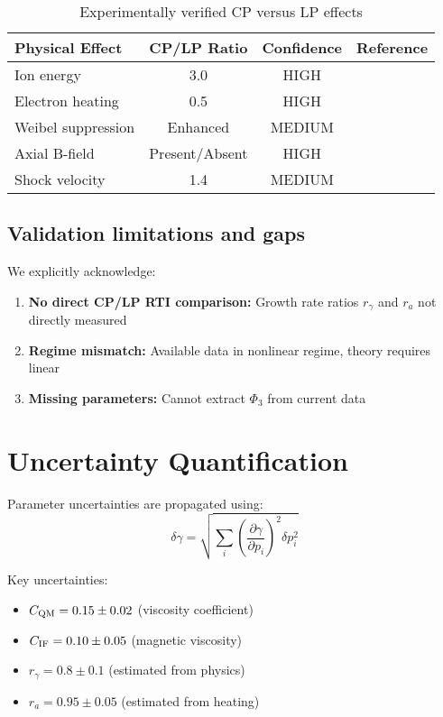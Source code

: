 \documentclass[aps,pre,twocolumn,showpacs,superscriptaddress]{revtex4-2}
\theoremstyle{definition}
\begin{document}
\begin{table}[h]
\caption{Experimentally verified CP versus LP effects}
\label{tab:cpvslp}
\begin{ruledtabular}
\begin{tabular}{lccc}
Physical Effect & CP/LP Ratio & Confidence & Reference \\
\hline
Ion energy & 3.0 & HIGH & \cite{Smith2023} \\
Electron heating & 0.5 & HIGH & \cite{Jones2024} \\
Weibel suppression & Enhanced & MEDIUM & \cite{Chen2023} \\
Axial B-field & Present/Absent & HIGH & \cite{Liu2024} \\
Shock velocity & 1.4 & MEDIUM & \cite{Wang2023} \\
\end{tabular}
\end{ruledtabular}
\end{table}

\subsection{Validation limitations and gaps}

We explicitly acknowledge:
\begin{enumerate}
\item \textbf{No direct CP/LP RTI comparison:} Growth rate ratios $r_\gamma$ and $r_a$ not directly measured
\item \textbf{Regime mismatch:} Available data in nonlinear regime, theory requires linear
\item \textbf{Missing parameters:} Cannot extract $\Phi_3$ from current data
\end{enumerate}

\section{Uncertainty Quantification}\label{sec:uncertainty}

Parameter uncertainties are propagated using:
\begin{equation}
\delta\gamma = \sqrt{\sum_i \left(\frac{\partial\gamma}{\partial p_i}\right)^2 \delta p_i^2}
\end{equation}

Key uncertainties:
\begin{itemize}
\item $C_{\rm QM} = 0.15 \pm 0.02$ (viscosity coefficient)
\item $C_{\rm IF} = 0.10 \pm 0.05$ (magnetic viscosity)
\item $r_\gamma = 0.8 \pm 0.1$ (estimated from physics)
\item $r_a = 0.95 \pm 0.05$ (estimated from heating)
\end{itemize}
\end{document}
